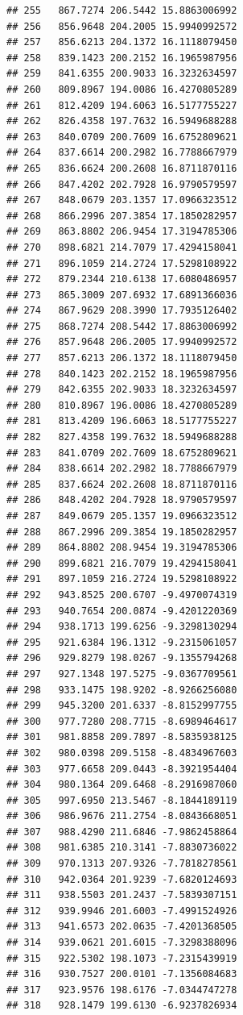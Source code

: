 \documentclass[
]{article}
\begin{document}
\begin{verbatim}
## 255   867.7274 206.5442 15.8863006992
## 256   856.9648 204.2005 15.9940992572
## 257   856.6213 204.1372 16.1118079450
## 258   839.1423 200.2152 16.1965987956
## 259   841.6355 200.9033 16.3232634597
## 260   809.8967 194.0086 16.4270805289
## 261   812.4209 194.6063 16.5177755227
## 262   826.4358 197.7632 16.5949688288
## 263   840.0709 200.7609 16.6752809621
## 264   837.6614 200.2982 16.7788667979
## 265   836.6624 200.2608 16.8711870116
## 266   847.4202 202.7928 16.9790579597
## 267   848.0679 203.1357 17.0966323512
## 268   866.2996 207.3854 17.1850282957
## 269   863.8802 206.9454 17.3194785306
## 270   898.6821 214.7079 17.4294158041
## 271   896.1059 214.2724 17.5298108922
## 272   879.2344 210.6138 17.6080486957
## 273   865.3009 207.6932 17.6891366036
## 274   867.9629 208.3990 17.7935126402
## 275   868.7274 208.5442 17.8863006992
## 276   857.9648 206.2005 17.9940992572
## 277   857.6213 206.1372 18.1118079450
## 278   840.1423 202.2152 18.1965987956
## 279   842.6355 202.9033 18.3232634597
## 280   810.8967 196.0086 18.4270805289
## 281   813.4209 196.6063 18.5177755227
## 282   827.4358 199.7632 18.5949688288
## 283   841.0709 202.7609 18.6752809621
## 284   838.6614 202.2982 18.7788667979
## 285   837.6624 202.2608 18.8711870116
## 286   848.4202 204.7928 18.9790579597
## 287   849.0679 205.1357 19.0966323512
## 288   867.2996 209.3854 19.1850282957
## 289   864.8802 208.9454 19.3194785306
## 290   899.6821 216.7079 19.4294158041
## 291   897.1059 216.2724 19.5298108922
## 292   943.8525 200.6707 -9.4970074319
## 293   940.7654 200.0874 -9.4201220369
## 294   938.1713 199.6256 -9.3298130294
## 295   921.6384 196.1312 -9.2315061057
## 296   929.8279 198.0267 -9.1355794268
## 297   927.1348 197.5275 -9.0367709561
## 298   933.1475 198.9202 -8.9266256080
## 299   945.3200 201.6337 -8.8152997755
## 300   977.7280 208.7715 -8.6989464617
## 301   981.8858 209.7897 -8.5835938125
## 302   980.0398 209.5158 -8.4834967603
## 303   977.6658 209.0443 -8.3921954404
## 304   980.1364 209.6468 -8.2916987060
## 305   997.6950 213.5467 -8.1844189119
## 306   986.9676 211.2754 -8.0843668051
## 307   988.4290 211.6846 -7.9862458864
## 308   981.6385 210.3141 -7.8830736022
## 309   970.1313 207.9326 -7.7818278561
## 310   942.0364 201.9239 -7.6820124693
## 311   938.5503 201.2437 -7.5839307151
## 312   939.9946 201.6003 -7.4991524926
## 313   941.6573 202.0635 -7.4201368505
## 314   939.0621 201.6015 -7.3298388096
## 315   922.5302 198.1073 -7.2315439919
## 316   930.7527 200.0101 -7.1356084683
## 317   923.9576 198.6176 -7.0344747278
## 318   928.1479 199.6130 -6.9237826934

\end{verbatim}
\end{document}

